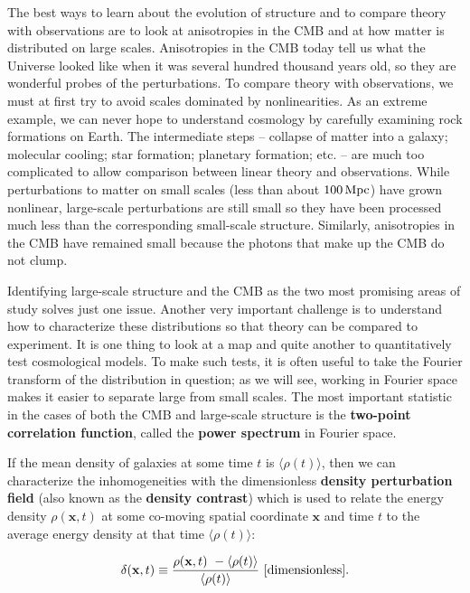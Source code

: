\documentclass[a4paper,11pt]{article}
\begin{document}
{\noindent}The best ways to learn about the evolution of structure and to compare theory with observations are to look at anisotropies in the CMB and at how matter is distributed on large scales. Anisotropies in the CMB today tell us what the Universe looked like when it was several hundred thousand years old, so they are wonderful probes of the perturbations. To compare theory with observations, we must at first try to avoid scales dominated by nonlinearities. As an extreme example, we can never hope to understand cosmology by carefully examining rock formations on Earth. The intermediate steps -- collapse of matter into a galaxy; molecular cooling; star formation; planetary formation; etc. -- are much too complicated to allow comparison between linear theory and observations. While perturbations to matter on small scales (less than about $100\,{\rm Mpc}$) have grown nonlinear, large-scale perturbations are still small so they have been processed much less than the corresponding small-scale structure. Similarly, anisotropies in the CMB have remained small because the photons that make up the CMB do not clump.

{\noindent}Identifying large-scale structure and the CMB as the two most promising areas of study solves just one issue. Another very important challenge is to understand how to characterize these distributions so that theory can be compared to experiment. It is one thing to look at a map and quite another to quantitatively test cosmological models. To make such tests, it is often useful to take the Fourier transform of the distribution in question; as we will see, working in Fourier space makes it easier to separate large from small scales. The most important statistic in the cases of both the CMB and large-scale structure is the \textbf{two-point correlation function}, called the \textbf{power spectrum} in Fourier space.

{\noindent}If the mean density of galaxies at some time $t$ is $\langle\rho(t)\rangle$, then we can characterize the inhomogeneities with the dimensionless \textbf{density perturbation field} (also known as the \textbf{density contrast}) which is used to relate the energy density $\rho(\mathbf{x},t)$ at some co-moving spatial coordinate $\mathbf{x}$ and time $t$ to the average energy density at that time $\langle\rho(t)\rangle$:

\begin{align*}
    \delta(\mathbf{x},t) \equiv \frac{\rho(\mathbf{x},t)~- \langle\rho(t)\rangle}{\langle\rho(t)\rangle} ~ [{\rm dimensionless}].
\end{align*}
\end{document}
